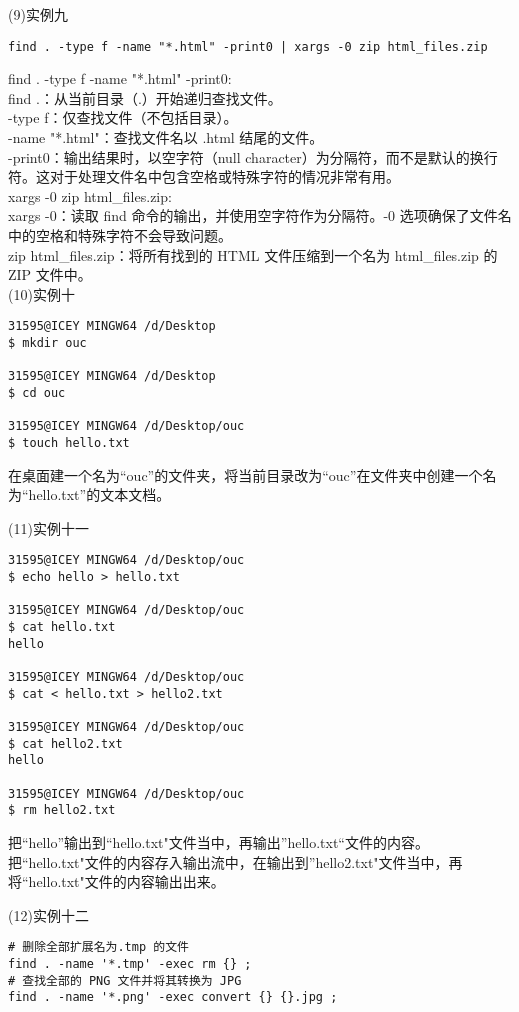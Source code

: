 \documentclass[a4paper, 12pt]{article}
\begin{document}
(9)实例九
\begin{Verbatim}
find . -type f -name "*.html" -print0 | xargs -0 zip html_files.zip
\end{Verbatim}
{\color{blue}
find . -type f -name "*.html" -print0:\\
find .：从当前目录（.）开始递归查找文件。\\
-type f：仅查找文件（不包括目录）。\\
-name "*.html"：查找文件名以 .html 结尾的文件。\\
-print0：输出结果时，以空字符（null character）为分隔符，而不是默认的换行符。这对于处理文件名中包含空格或特殊字符的情况非常有用。\\

xargs -0 zip html\_files.zip:\\
xargs -0：读取 find 命令的输出，并使用空字符作为分隔符。-0 选项确保了文件名中的空格和特殊字符不会导致问题。\\
zip html\_files.zip：将所有找到的 HTML 文件压缩到一个名为 html\_files.zip 的 ZIP 文件中。\\
}
(10)实例十
\begin{Verbatim}
31595@ICEY MINGW64 /d/Desktop
$ mkdir ouc

31595@ICEY MINGW64 /d/Desktop
$ cd ouc

31595@ICEY MINGW64 /d/Desktop/ouc
$ touch hello.txt
\end{Verbatim}
{\color{blue}
在桌面建一个名为“ouc”的文件夹，将当前目录改为“ouc”在文件夹中创建一个名为“hello.txt”的文本文档。\\
}

(11)实例十一
\begin{Verbatim}
31595@ICEY MINGW64 /d/Desktop/ouc
$ echo hello > hello.txt

31595@ICEY MINGW64 /d/Desktop/ouc
$ cat hello.txt
hello

31595@ICEY MINGW64 /d/Desktop/ouc
$ cat < hello.txt > hello2.txt

31595@ICEY MINGW64 /d/Desktop/ouc
$ cat hello2.txt
hello

31595@ICEY MINGW64 /d/Desktop/ouc
$ rm hello2.txt
\end{Verbatim}
{\color{blue}
把“hello”输出到“hello.txt"文件当中，再输出”hello.txt“文件的内容。\\
把“hello.txt"文件的内容存入输出流中，在输出到”hello2.txt"文件当中，再将“hello.txt"文件的内容输出出来。\\
}

(12)实例十二
\begin{Verbatim}
# 删除全部扩展名为.tmp 的文件
find . -name '*.tmp' -exec rm {} ;
# 查找全部的 PNG 文件并将其转换为 JPG
find . -name '*.png' -exec convert {} {}.jpg ;
\end{Verbatim}
\end{document}
